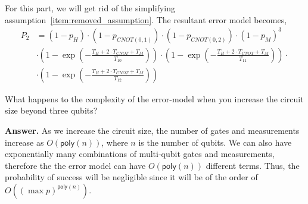 For this part, we will get rid of the simplifying assumption~\ref{item:removed_assumption}. The resultant error model becomes,
\begin{equation}
    \begin{split}
    P_2 &= (1-p_H)\cdot(1-p_{CNOT(0, 1)})\cdot(1-p_{CNOT(0,2)})\cdot(1-p_M)^3\\
    &\cdot \left(1 - \exp\left(-\frac{T_H + 2\cdot T_{CNOT} + T_M}{T_{10}}\right)\right)\cdot \left(1 - \exp\left(-\frac{T_H + 2\cdot T_{CNOT} + T_M}{T_{11}}\right)\right)\cdot\\
        & \cdot \left(1 - \exp\left(-\frac{T_H + 2\cdot T_{CNOT} + T_M}{T_{12}}\right)\right) 
    \end{split}
\end{equation}

\tcbline{}

\begin{question}
    What happens to the complexity of the error-model when you increase the circuit size beyond three qubits?
\end{question}
\textbf{Answer.} As we increase the circuit size, the number of gates and measurements increase as $O(\mathsf{poly}(n))$, where $n$ is the number of qubits. We can also have exponentially many combinations of multi-qubit gates and measurements, therefore the the error model can have $O(\mathsf{poly}(n))$ different terms. Thus, the probability of success will be negligible since it will be of the order of $O(\left(\max{p}\right)^{\mathsf{poly}(n)})$.

